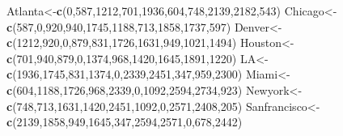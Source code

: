 \documentclass[]{article}
\newenvironment{Shaded}{\begin{snugshade}}{\end{snugshade}}
\newcommand{\KeywordTok}[1]{\textcolor[rgb]{0.13,0.29,0.53}{\textbf{{#1}}}}
\newcommand{\DecValTok}[1]{\textcolor[rgb]{0.00,0.00,0.81}{{#1}}}
\newcommand{\NormalTok}[1]{{#1}}
\begin{document}
\begin{Shaded}
\begin{Highlighting}[]
\NormalTok{Atlanta<-}\KeywordTok{c}\NormalTok{(}\DecValTok{0}\NormalTok{,}\DecValTok{587}\NormalTok{,}\DecValTok{1212}\NormalTok{,}\DecValTok{701}\NormalTok{,}\DecValTok{1936}\NormalTok{,}\DecValTok{604}\NormalTok{,}\DecValTok{748}\NormalTok{,}\DecValTok{2139}\NormalTok{,}\DecValTok{2182}\NormalTok{,}\DecValTok{543}\NormalTok{)}
\NormalTok{Chicago<-}\KeywordTok{c}\NormalTok{(}\DecValTok{587}\NormalTok{,}\DecValTok{0}\NormalTok{,}\DecValTok{920}\NormalTok{,}\DecValTok{940}\NormalTok{,}\DecValTok{1745}\NormalTok{,}\DecValTok{1188}\NormalTok{,}\DecValTok{713}\NormalTok{,}\DecValTok{1858}\NormalTok{,}\DecValTok{1737}\NormalTok{,}\DecValTok{597}\NormalTok{)}
\NormalTok{Denver<-}\KeywordTok{c}\NormalTok{(}\DecValTok{1212}\NormalTok{,}\DecValTok{920}\NormalTok{,}\DecValTok{0}\NormalTok{,}\DecValTok{879}\NormalTok{,}\DecValTok{831}\NormalTok{,}\DecValTok{1726}\NormalTok{,}\DecValTok{1631}\NormalTok{,}\DecValTok{949}\NormalTok{,}\DecValTok{1021}\NormalTok{,}\DecValTok{1494}\NormalTok{)}
\NormalTok{Houston<-}\KeywordTok{c}\NormalTok{(}\DecValTok{701}\NormalTok{,}\DecValTok{940}\NormalTok{,}\DecValTok{879}\NormalTok{,}\DecValTok{0}\NormalTok{,}\DecValTok{1374}\NormalTok{,}\DecValTok{968}\NormalTok{,}\DecValTok{1420}\NormalTok{,}\DecValTok{1645}\NormalTok{,}\DecValTok{1891}\NormalTok{,}\DecValTok{1220}\NormalTok{)}
\NormalTok{LA<-}\KeywordTok{c}\NormalTok{(}\DecValTok{1936}\NormalTok{,}\DecValTok{1745}\NormalTok{,}\DecValTok{831}\NormalTok{,}\DecValTok{1374}\NormalTok{,}\DecValTok{0}\NormalTok{,}\DecValTok{2339}\NormalTok{,}\DecValTok{2451}\NormalTok{,}\DecValTok{347}\NormalTok{,}\DecValTok{959}\NormalTok{,}\DecValTok{2300}\NormalTok{)}
\NormalTok{Miami<-}\KeywordTok{c}\NormalTok{(}\DecValTok{604}\NormalTok{,}\DecValTok{1188}\NormalTok{,}\DecValTok{1726}\NormalTok{,}\DecValTok{968}\NormalTok{,}\DecValTok{2339}\NormalTok{,}\DecValTok{0}\NormalTok{,}\DecValTok{1092}\NormalTok{,}\DecValTok{2594}\NormalTok{,}\DecValTok{2734}\NormalTok{,}\DecValTok{923}\NormalTok{)}
\NormalTok{Newyork<-}\KeywordTok{c}\NormalTok{(}\DecValTok{748}\NormalTok{,}\DecValTok{713}\NormalTok{,}\DecValTok{1631}\NormalTok{,}\DecValTok{1420}\NormalTok{,}\DecValTok{2451}\NormalTok{,}\DecValTok{1092}\NormalTok{,}\DecValTok{0}\NormalTok{,}\DecValTok{2571}\NormalTok{,}\DecValTok{2408}\NormalTok{,}\DecValTok{205}\NormalTok{)}
\NormalTok{Sanfrancisco<-}\KeywordTok{c}\NormalTok{(}\DecValTok{2139}\NormalTok{,}\DecValTok{1858}\NormalTok{,}\DecValTok{949}\NormalTok{,}\DecValTok{1645}\NormalTok{,}\DecValTok{347}\NormalTok{,}\DecValTok{2594}\NormalTok{,}\DecValTok{2571}\NormalTok{,}\DecValTok{0}\NormalTok{,}\DecValTok{678}\NormalTok{,}\DecValTok{2442}\NormalTok{)}

\end{Highlighting}
\end{Shaded}
\end{document}
